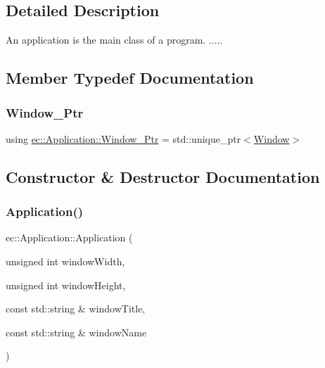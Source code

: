 \subsection{Detailed Description}
An application is the main class of a program. ..... 

\subsection{Member Typedef Documentation}
\mbox{\label{classec_1_1_application_af1e09a0f1b603eab8d3245d8b8075ad5}} 
\subsubsection{\texorpdfstring{Window\+\_\+\+Ptr}{Window\_Ptr}}
{\footnotesize\ttfamily using \mbox{\hyperlink{classec_1_1_application_af1e09a0f1b603eab8d3245d8b8075ad5}{ec\+::\+Application\+::\+Window\+\_\+\+Ptr}} =  std\+::unique\+\_\+ptr$<$\mbox{\hyperlink{classec_1_1_window}{Window}}$>$}



\subsection{Constructor \& Destructor Documentation}
\mbox{\label{classec_1_1_application_af4a94888105d739a2de75be17ce9ad67}} 
\subsubsection{\texorpdfstring{Application()}{Application()}}
{\footnotesize\ttfamily ec\+::\+Application\+::\+Application (\begin{DoxyParamCaption}\item[{unsigned int}]{window\+Width,  }\item[{unsigned int}]{window\+Height,  }\item[{const std\+::string \&}]{window\+Title,  }\item[{const std\+::string \&}]{window\+Name }\end{DoxyParamCaption})\hspace{0.3cm}{\ttfamily [explicit]}}



